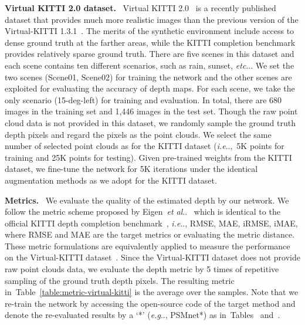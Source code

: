 \documentclass[letterpaper, 10 pt, conference]{ieeeconf}
\makeatletter
\DeclareRobustCommand\onedot{\futurelet\@let@token\@onedot}
\def\@onedot{\ifx\@let@token.\else.\null\fi\xspace}
\def\eg{\emph{e.g}\onedot} \def\Eg{{E.g}\onedot}
\def\ie{\emph{i.e}\onedot} \def\Ie{{I.e}\onedot}
\def\etc{\emph{etc}\onedot} \def\vs{{vs}\onedot}
\def\etal{\emph{et al}\onedot}
\newcommand{\Tref}[1]{Table~\textcolor{blue}{\ref{#1}}}
\newcommand{\RNum}[1]{\uppercase\expandafter{\romannumeral #1\relax}}
\makeatother
\begin{document}
\noindent \textbf{Virtual KITTI 2.0 dataset.} \
Virtual KITTI 2.0~\cite{virtual-kitti} is a recently published dataset that provides much more realistic images than the previous version of the Virtual-KITTI 1.3.1~\cite{virtual-kitti-cvpr2016}. The merits of the synthetic environment include access to dense ground truth at the farther areas, while the KITTI completion benchmark~\cite{kitti-completion} provides relatively sparse ground truth. There are five scenes in this dataset and each scene contains ten different scenarios, such as rain, sunset, \etc. We set the two scenes (Scene01, Scene02) for training the network and the other scenes are exploited for evaluating the accuracy of depth maps. For each scene, we take the only scenario (15-deg-left) for training and evaluation. In total, there are 680 images in the training set and 1,446 images in the test set. Though the raw point cloud data is not provided in this dataset, we randomly sample the ground truth depth pixels and regard the pixels as the point clouds. We select the same number of selected point clouds as for the KITTI dataset (\ie,~5K points for training and 25K points for testing). 
Given pre-trained weights from the KITTI dataset, 
we fine-tune the network for 5K iterations under the identical augmentation methods as we adopt for the KITTI dataset.



\noindent \textbf{Metrics.} \
We evaluate the quality of the estimated depth by our network. We follow the metric scheme proposed by Eigen~\etal~\cite{eigen_mono_depth} which is identical to the official KITTI depth completion benchmark~\cite{kitti-completion}, \ie, RMSE, MAE, iRMSE, iMAE, where RMSE and MAE are the target metrics or evaluating the metric distance. These metric formulations are equivalently applied to measure the performance on the Virtual-KITTI dataset~\cite{virtual-kitti}. Since the Virtual-KITTI dataset does not provide raw point clouds data, we evaluate the depth metric by 5 times of repetitive sampling of the ground truth depth pixels. The resulting metric in~\Tref{table:metric-virtual-kitti} is the average over the samples. 
Note that we re-train the network by accessing the open-source code of the target method and denote the re-evaluated results by a `*' (\eg, PSMnet*) as in~Tables~\textcolor{blue}{\RNum{1}} and~\textcolor{blue}{\RNum{2}}.
\end{document}
